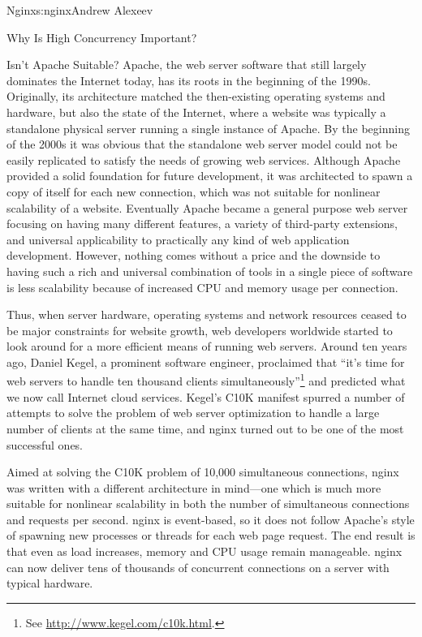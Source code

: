 \begin{aosachapter}{Nginx}{s:nginx}{Andrew Alexeev}
\begin{aosasect1}{Why Is High Concurrency Important?}
\begin{aosasect2}{Isn't Apache Suitable?}
Apache, the web server software that still largely dominates the
Internet today, has its roots in the beginning of the
1990s. Originally, its architecture matched the then-existing
operating systems and hardware, but also the state of the 
Internet, where a website was typically a standalone physical server
running a single instance of Apache. By the beginning of the 2000s it
was obvious that the standalone web server model could not be easily
replicated to satisfy the needs of growing web services. Although
Apache provided a solid foundation for future development, it was
architected to spawn a copy of itself for each new connection, which
was not suitable for nonlinear scalability of a website. Eventually
Apache became a general purpose web server focusing on having many
different features, a variety of third-party extensions, and universal
applicability to practically any kind of web application
development. However, nothing comes without a price and the downside
to having such a rich and universal combination of tools in a single
piece of software is less scalability because of increased CPU and
memory usage per connection.

Thus, when server hardware, operating systems and network resources
ceased to be major constraints for website growth, web developers
worldwide started to look around for a more efficient means of running
web servers. Around ten years ago, Daniel Kegel, a prominent software
engineer, proclaimed that ``it's time for web servers to handle ten
thousand clients simultaneously''\footnote{See
\url{http://www.kegel.com/c10k.html}.} and predicted what we
now call Internet cloud services. Kegel's C10K manifest spurred a
number of attempts to solve the problem of web server optimization to
handle a large number of clients at the same time, and nginx turned
out to be one of the most successful ones.

Aimed at solving the C10K problem of 10,000 simultaneous connections,
nginx was written with a different architecture in mind---one which is
much more suitable for nonlinear scalability in both the number of
simultaneous connections and requests per second. nginx is
event-based, so it does not follow Apache's style of spawning new
processes or threads for each web page request. The end result is that
even as load increases, memory and CPU usage remain manageable. nginx
can now deliver tens of thousands of concurrent connections on a
server with typical hardware.


\end{aosasect2}
\end{aosasect1}
\end{aosachapter}
